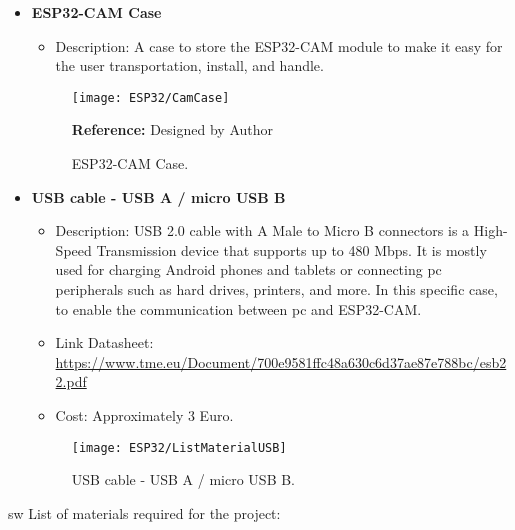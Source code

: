\begin{itemize}
    \item \textbf{ESP32-CAM Case} 
    
    \begin{itemize}
        \item Description: A case to store the ESP32-CAM module to make it easy for the user transportation, install, and handle.
    \end{itemize}
    
    \begin{figure}  
        \begin{center}
            \texttt{[image: ESP32/CamCase]}
            \caption{ESP32-CAM Case.} 
            \label{fig:ESP32-CAM Case.}
            \footnotesize \textbf{Reference:} Designed by Author
        \end{center}
    \end{figure}	
    
    \item \textbf{USB cable - USB A / micro USB B}
    
    \begin{itemize}
        \item Description: USB 2.0 cable with A Male to Micro B connectors is a High-Speed Transmission device that supports up to 480 Mbps. It is mostly used for charging Android phones and tablets or connecting \ac{pc} peripherals such as hard drives, printers, and more. In this specific case, to enable the communication between \ac{pc} and ESP32-CAM.
        \item Link Datasheet: \url{https://www.tme.eu/Document/700e9581ffc48a630c6d37ae87e788bc/esb22.pdf}
        \item Cost: Approximately 3 Euro.
    \end{itemize}
    \begin{figure}  
        \begin{center}
            \texttt{[image: ESP32/ListMaterialUSB]}
            \caption{USB cable - USB A / micro USB B.} 
            \label{fig:USB cable - USB A / micro USB B.}
        \end{center}
    \end{figure}	
\end{itemize}
\ac{sw} List of materials required for the project:
